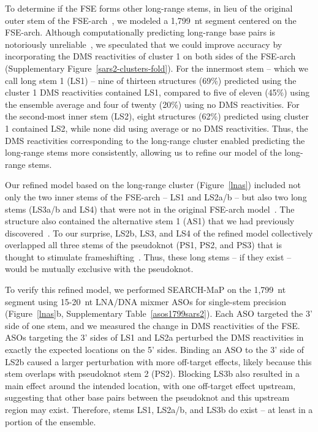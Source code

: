 \documentclass[main.tex]{subfiles}
\begin{document}
To determine if the FSE forms other long-range stems, in lieu of the original outer stem of the FSE-arch~\cite{Ziv2020}, we modeled a 1,799~nt segment centered on the FSE-arch.
Although computationally predicting long-range base pairs is notoriously unreliable~\cite{Doshi2004,Nicholson2015}, we speculated that we could improve accuracy by incorporating the DMS reactivities of cluster 1 on both sides of the FSE-arch (Supplementary Figure~\ref{sars2-clusters-fold}).
For the innermost stem -- which we call long stem 1 (LS1) -- nine of thirteen structures (69\%) predicted using the cluster 1 DMS reactivities contained LS1, compared to five of eleven (45\%) using the ensemble average and four of twenty (20\%) using no DMS reactivities.
For the second-most inner stem (LS2), eight structures (62\%) predicted using cluster 1 contained LS2, while none did using average or no DMS reactivities.
Thus, the DMS reactivities corresponding to the long-range cluster enabled predicting the long-range stems more consistently, allowing us to refine our model of the long-range stems.

Our refined model based on the long-range cluster (Figure~\ref{lnas}) included not only the two inner stems of the FSE-arch -- LS1 and LS2a/b -- but also two long stems (LS3a/b and LS4) that were not in the original FSE-arch model~\cite{Ziv2020}.
The structure also contained the alternative stem 1 (AS1) that we had previously discovered~\cite{Lan2022}.
To our surprise, LS2b, LS3, and LS4 of the refined model collectively overlapped all three stems of the pseudoknot (PS1, PS2, and PS3) that is thought to stimulate frameshifting~\cite{Kelly2020,KZhang2021,Jones2022}.
Thus, these long stems -- if they exist -- would be mutually exclusive with the pseudoknot.

To verify this refined model, we performed SEARCH-MaP on the 1,799~nt segment using 15-20~nt LNA/DNA mixmer ASOs for single-stem precision (Figure~\ref{lnas}b, Supplementary Table~\ref{asos1799sars2}).
Each ASO targeted the 3' side of one stem, and we measured the change in DMS reactivities of the FSE.
ASOs targeting the 3' sides of LS1 and LS2a perturbed the DMS reactivities in exactly the expected locations on the 5' sides.
Binding an ASO to the 3' side of LS2b caused a larger perturbation with more off-target effects, likely because this stem overlaps with pseudoknot stem 2 (PS2).
Blocking LS3b also resulted in a main effect around the intended location, with one off-target effect upstream, suggesting that other base pairs between the pseudoknot and this upstream region may exist.
Therefore, stems LS1, LS2a/b, and LS3b do exist -- at least in a portion of the ensemble.
\end{document}
